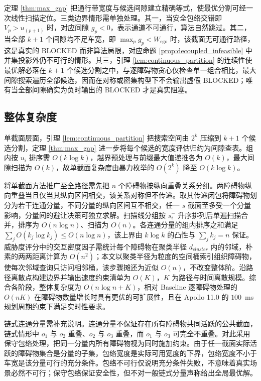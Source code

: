 \documentclass[a4paper,11pt]{ctexart}
\theoremstyle{definition}
\begin{document}
定理 \ref{thm:max_gap} 把通行带宽度与候选间隙建立精确等式，使最优分割可经一次线性扫描定位。三类边界情形需单独处理。其一，当安全包络交错即 $V_p > u_{(p+1)}$ 时，对应间隙 $g_p < 0$，表示通道不可通行，算法自然跳过。其二，当全部 $k+1$ 个间隙均不足车宽，即 $\max_p g_p < W_{\text{ego}}$ 时，该截面无可通行路径，这是真实的 BLOCKED 而非算法局限，对应命题 \ref{prop:decoupled_infeasible} 中并集投影外仍不可行的情形。其三，引理 \ref{lem:continuous_partition} 的连续性使最优解必落在 $k+1$ 个候选分割之中，与逐障碍物贪心仅检查单一组合相比，最大间隙搜索遍历全部候选，因而在对称或密集构型下不会输出虚假 BLOCKED；唯有当全部间隙确实为负时输出的 BLOCKED 才是真实阻塞。

\subsection{整体复杂度}
\label{sec:thy_complexity}

单截面层面，引理 \ref{lem:continuous_partition} 把搜索空间由 $2^k$ 压缩到 $k+1$ 个候选分割，定理 \ref{thm:max_gap} 进一步将每个候选的宽度评估归约为间隙查表。组内按 $u_i$ 排序需 $O(k \log k)$，越界预处理与前缀最大值递推各为 $O(k)$，最大间隙扫描为 $O(k)$，故单截面复杂度由暴力枚举的 $O(2^k)$ 降至 $O(k \log k)$。

将单截面方法推广至全路径需先把 $n$ 个障碍物按纵向重叠关系分组。两障碍物纵向重叠当且仅当其纵向区间相交，该关系对称但不传递。取其传递闭包将障碍物划分为若干连通分量，不同分量的纵向区间互不相交，任一 $s$ 截面至多受一个分量影响，分量间的避让决策可独立求解。扫描线分组按 $s_i^{-}$ 升序排列后单遍扫描合并，排序为 $O(n \log n)$、扫描为 $O(n)$。各连通分量的组内排序之和满足 $\sum_j O(k_j \log k_j) \leq O(n \log n)$，该上界由 $k \log k$ 的凸性与 $\sum_j k_j = n$ 保证。威胁度评分中的交互密度因子需统计每个障碍物在聚类半径 $d_{cluster}$ 内的邻域，朴素的两两距离计算为 $O(n^2)$；本文以聚类半径为粒度的空间桶索引组织障碍物，使每次邻域查询只访问相邻桶，该步骤摊还为近似 $O(n)$，不改变整体阶。沿路径离散点构建边界并输出速度约束清单为 $O(K)$，$K$ 为路径与时间离散规模。综合各阶段，整体复杂度为 $O(n \log n + K)$，相对 Baseline 逐障碍物处理的 $O(nK)$ 在障碍物数量增长时具有更优的可扩展性，且在 Apollo 11.0 的 $100$~ms 规划周期约束下满足实时性要求。

链式连通分量需补充说明。连通分量不保证存在所有障碍物共同活跃的公共截面，链式情形中 $o_1$ 与 $o_2$ 重叠、$o_2$ 与 $o_3$ 重叠，而 $o_1$ 与 $o_3$ 可完全不重叠。对此采用保守包络处理，把同一分量内所有障碍物视为同时施加约束。由于任一截面实际活跃的障碍物集合是分量的子集，包络宽度是实际可用宽度的下界，包络宽度不小于车宽是该分量可行的充分条件。包络不可行仅说明充分条件失败，不意味着真实场景必然不可行；保守包络保证安全性，但不对一般链式分量声称给出全局最优解。
\end{document}
